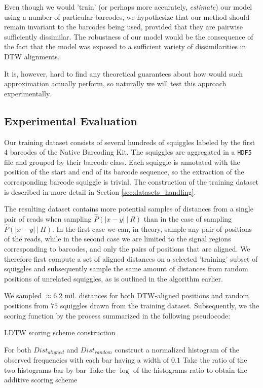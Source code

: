 Even though we would 'train' (or perhaps more accurately, \textit{estimate}) our model using a number of particular barcodes, we hypothesize that our method should remain invariant to the barcodes being used, provided that they are pairwise sufficiently dissimilar. The robustness of our model would be the consequence of the fact that the model was exposed to a sufficient variety of dissimilarities in DTW alignments.

It is, however, hard to find any theoretical guarantees about how would such approximation actually perform, so naturally we will test this approach experimentally.

\subsection{Experimental Evaluation}
Our training dataset consists of several hundreds of squiggles labeled by the first $4$ barcodes of the Native Barcoding Kit. The squiggles are aggregated in a \texttt{HDF5} file and grouped by their barcode class. Each squiggle is annotated with the position of the start and end of its barcode sequence, so the extraction of the corresponding barcode squiggle is trivial. The construction of the training dataset is described in more detail in Section \ref{sec:datasets_handling}.

The resulting dataset contains more potential samples of distances from a single pair of reads when sampling $\hat{P}(|x-y| ~|~ R)$ than in the case of sampling $\hat{P}(|x-y| ~|~ H)$. In the first case we can, in theory, sample any pair of positions of the reads, while in the second case we are limited to the signal regions corresponding to barcodes, and only the pairs of positions that are aligned. We therefore first compute a set of aligned distances on a selected 'training' subset of squiggles and subsequently sample the same amount of distances from random positions of unrelated squiggles, as is outlined in the algorithm earlier.

We sampled $\approx 6.2$ mil. distances for both DTW-aligned positions and random positions from $75$ squiggles drawn from the training dataset. Subsequently, we the scoring function by the process summarized in the following pseudocode:
\begin{algorithm}[H]
\renewcommand{\thealgorithm}{}
\caption{LDTW scoring scheme construction}
\label{alg:scoring_preparation}
\begin{algorithmic}[1]
\STATE For both $Dist_{aligned}$ and $Dist_{random}$  construct a normalized histogram of the observed frequencies with each bar having a width of $0.1$
\STATE Take the ratio of the two histograms bar by bar
\STATE Take the $\log$ of the histograms ratio to obtain the additive scoring scheme
\end{algorithmic}
\end{algorithm} 
\bigskip

